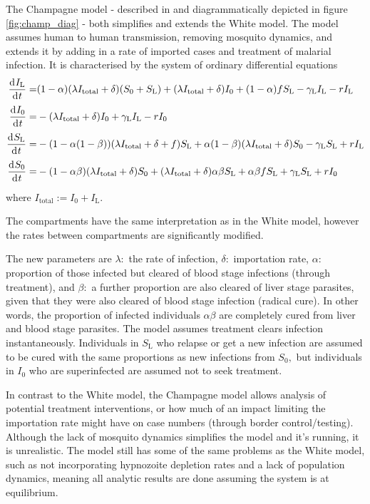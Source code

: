 The Champagne model - described in \parencite{champagne_using_2022} and diagrammatically depicted in figure \ref{fig:champ_diag} - both simplifies and extends the White model. The model assumes human to human transmission, removing mosquito dynamics, and extends it by adding in a rate of imported cases and treatment of malarial infection. It is characterised by the system of ordinary differential equations
\begin{align*}
    \frac{\diff I_\mathrm{L}}{\diff t} = & (1 - \alpha)(\lambda I_\mathrm{total} + \delta)(S_0 + S_\mathrm{L}) + (\lambda I_\mathrm{total} + \delta)I_0 + (1 - \alpha)fS_\mathrm{L} - \gamma_\mathrm{L}I_\mathrm{L} - rI_\mathrm{L}  \\
    \frac{\diff I_0}{\diff t} =          & -(\lambda I_\mathrm{total} + \delta)I_0 + \gamma_\mathrm{L}I_\mathrm{L} - rI_0                                                                                                            \\
    \frac{\diff S_\mathrm{L}}{\diff t} = & -(1 - \alpha(1 - \beta))(\lambda I_\mathrm{total} + \delta + f)S_\mathrm{L} + \alpha(1-\beta)(\lambda I_\mathrm{total} + \delta)S_0 - \gamma_\mathrm{L}S_\mathrm{L} + rI_\mathrm{L}       \\
    \frac{\diff S_0}{\diff t} =          & -(1 - \alpha\beta)(\lambda I_\mathrm{total} + \delta)S_0 + (\lambda I_\mathrm{total} + \delta)\alpha\beta S_\mathrm{L} + \alpha\beta fS_\mathrm{L} + \gamma_\mathrm{L}S_\mathrm{L} + rI_0
\end{align*} where $I_\mathrm{total} := I_0 + I_\mathrm{L}.$

The compartments have the same interpretation as in the White model, however the rates between compartments are significantly modified.

The new parameters are $\lambda:$ the rate of infection, $\delta:$ importation rate, $\alpha:$ proportion of those infected but cleared of blood stage infections (through treatment), and $\beta:$ a further proportion are also cleared of liver stage parasites, given that they were also cleared of blood stage infection (radical cure). In other words, the proportion of infected individuals $\alpha\beta$ are completely cured from liver and blood stage parasites. The model assumes treatment clears infection instantaneously. Individuals in $S_\mathrm{L}$ who relapse or get a new infection are assumed to be cured with the same proportions as new infections from $S_0,$ but individuals in $I_0$ who are superinfected are assumed not to seek treatment.

In contrast to the White model, the Champagne model allows analysis of potential treatment interventions, or how much of an impact limiting the importation rate might have on case numbers (through border control/testing). Although the lack of mosquito dynamics simplifies the model and it's running, it is unrealistic. The model still has some of the same problems as the White model, such as not incorporating hypnozoite depletion rates and a lack of population dynamics, meaning all analytic results are done assuming the system is at equilibrium.
